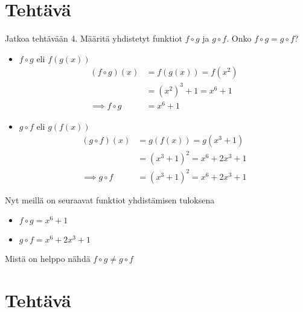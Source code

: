 \documentclass{article}
\newcounter{tehtava}
\begin{document}
    \section*{Tehtävä \thetehtava}
    Jatkoa tehtävään 4. Määritä yhdistetyt funktiot $f \circ g$ ja $g \circ f$. Onko $f \circ g = g \circ f$?
    \begin{itemize}
        \item[]$f \circ g$ eli $f(g(x))$
            \[
                \begin{aligned}
                    (f \circ g)(x) &= f(g(x)) = f(x^2) \\
                    &= (x^2)^3 + 1 = x^6 + 1 \\
                    \implies f \circ g &= x^6 + 1
                \end{aligned}
            \]
        \item[]$g \circ f$ eli $g(f(x))$
                \[
                    \begin{aligned}
                        (g \circ f)(x) &= g(f(x)) = g(x^3 + 1) \\
                        &= (x^3 + 1)^2 = x^6 + 2x^3 + 1 \\
                        \implies g \circ f &= (x^3 + 1)^2 = x^6 + 2x^3 + 1                        
                    \end{aligned}
                \]
    \end{itemize}
    Nyt meillä on seuraavat funktiot yhdistämisen tuloksena
    \begin{itemize}
        \item $f \circ g = x^6 + 1$
        \item $g \circ f = x^6 + 2x^3 + 1$
    \end{itemize}
    Mistä on helppo nähdä $f \circ g \neq g \circ f$


    \newpage
    \section*{Tehtävä \thetehtava}
\end{document}
